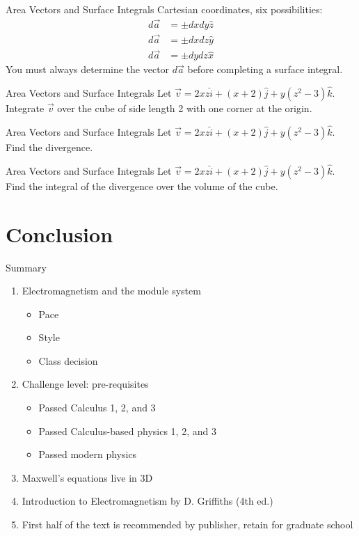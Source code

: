 \documentclass{beamer}
\begin{document}
\begin{frame}{Area Vectors and Surface Integrals}
Cartesian coordinates, six possibilities:
\begin{align}
d\vec{a} &= \pm dx dy \hat{z} \\
d\vec{a} &= \pm dx dz \hat{y} \\
d\vec{a} &= \pm dy dz \hat{x}
\end{align}
You must always determine the vector $d\vec{a}$ before completing a surface integral. 
\end{frame}

\begin{frame}{Area Vectors and Surface Integrals}
\small
Let $\vec{v} = 2xz \hat{i} + (x+2)\hat{j} + y(z^2-3)\hat{k}$.  Integrate $\vec{v}$ over the cube of side length 2 with one corner at the origin. \\ \vspace{6cm}
\end{frame}

\begin{frame}{Area Vectors and Surface Integrals}
\small
Let $\vec{v} = 2xz \hat{i} + (x+2)\hat{j} + y(z^2-3)\hat{k}$.  Find the divergence. \\ \vspace{6cm}
\end{frame}

\begin{frame}{Area Vectors and Surface Integrals}
\small
Let $\vec{v} = 2xz \hat{i} + (x+2)\hat{j} + y(z^2-3)\hat{k}$.  Find the integral of the divergence over the volume of the cube. \\ \vspace{6cm}
\end{frame}

\section{Conclusion}

\begin{frame}{Summary}
\begin{enumerate}
\item Electromagnetism and the module system
\begin{itemize}
\item Pace
\item Style
\item Class decision
\end{itemize}
\item Challenge level: pre-requisites
\begin{itemize}
\item Passed Calculus 1, 2, and 3
\item Passed Calculus-based physics 1, 2, and 3
\item Passed modern physics
\end{itemize}
\item Maxwell's equations live in 3D
\item \alert{Introduction to Electromagnetism by D. Griffiths (4th ed.)}
\item First half of the text is recommended by publisher, retain for graduate school
\end{enumerate}
\end{frame}
\end{document}
